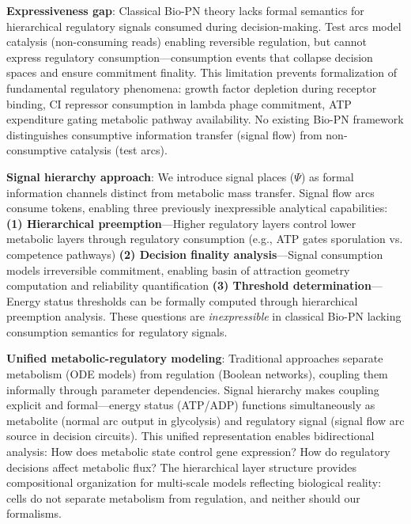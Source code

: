 \documentclass[twocolumn,11pt]{article}
\begin{document}
\vspace{3pt}
\noindent\textbf{Expressiveness gap}: Classical Bio-PN theory lacks formal semantics for hierarchical regulatory signals consumed during decision-making. Test arcs model catalysis (non-consuming reads) enabling reversible regulation, but cannot express regulatory consumption---consumption events that collapse decision spaces and ensure commitment finality. This limitation prevents formalization of fundamental regulatory phenomena: growth factor depletion during receptor binding, CI repressor consumption in lambda phage commitment, ATP expenditure gating metabolic pathway availability. No existing Bio-PN framework distinguishes consumptive information transfer (signal flow) from non-consumptive catalysis (test arcs).

\vspace{3pt}
\noindent\textbf{Signal hierarchy approach}: We introduce signal places ($\Psi$) as formal information channels distinct from metabolic mass transfer. Signal flow arcs consume tokens, enabling three previously inexpressible analytical capabilities: \textbf{(1) Hierarchical preemption}---Higher regulatory layers control lower metabolic layers through regulatory consumption (e.g., ATP gates sporulation vs. competence pathways) \textbf{(2) Decision finality analysis}---Signal consumption models irreversible commitment, enabling basin of attraction geometry computation and reliability quantification \textbf{(3) Threshold determination}---Energy status thresholds can be formally computed through hierarchical preemption analysis. These questions are \textit{inexpressible} in classical Bio-PN lacking consumption semantics for regulatory signals.

\vspace{3pt}
\noindent\textbf{Unified metabolic-regulatory modeling}: Traditional approaches separate metabolism (ODE models) from regulation (Boolean networks), coupling them informally through parameter dependencies. Signal hierarchy makes coupling explicit and formal---energy status (ATP/ADP) functions simultaneously as metabolite (normal arc output in glycolysis) and regulatory signal (signal flow arc source in decision circuits). This unified representation enables bidirectional analysis: How does metabolic state control gene expression? How do regulatory decisions affect metabolic flux? The hierarchical layer structure provides compositional organization for multi-scale models reflecting biological reality: cells do not separate metabolism from regulation, and neither should our formalisms.
\end{document}
